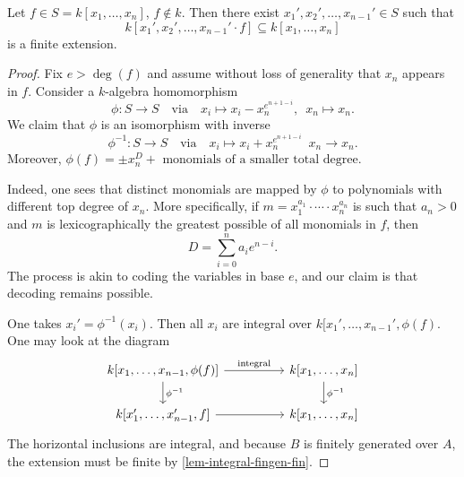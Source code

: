 \begin{lemma}
  Let $f \in S = k[x_1, \dotsc, x_n]$, $f \notin k$. Then there exist $x_1', x_2', \dotsc, x_{n-1}' \in S$ such that
  \[k[x_1', x_2', \dotsc, x_{n-1}' \cdot f] \subseteq k[x_1, \dotsc, x_n]\]
  is a finite extension.
\end{lemma}
\begin{proof}
  Fix $e > \deg(f)$ and assume without loss of generality that $x_n$ appears in $f$. Consider a $k$-algebra homomorphism
  \[ \phi \colon S \to S \quad \text{via} \quad x_i \mapsto x_i - x_n^{e^{n+1-i}}, \enspace x_n \mapsto x_n.\]
  We claim that $\phi$ is an isomorphism with inverse
  \[ \phi^{-1} \colon S \to S \quad \text{via} \quad x_i \mapsto x_i + x_n^{e^{n+1-i}} \enspace x_n \to x_n.\]
  Moreover, $\phi(f) = \pm x_n^D + \text{ monomials of a smaller total degree}$.

  Indeed, one sees that distinct monomials are mapped by $\phi$ to polynomials with different top degree of $x_n$. More specifically, if $m = x_1^{a_1} \cdot \dotsb \cdot x_n^{a_n}$ is such that $a_n > 0$ and $m$ is lexicographically the greatest possible of all monomials in $f$, then
  \[ D = \sum_{i=0}^n a_i e^{n-i}.\]
  The process is akin to coding the variables in base $e$, and our claim is that decoding remains possible.

  One takes $x_i' = \phi^{-1}(x_i)$. Then all $x_i$ are integral over $k[x_1', \dotsc, x_{n-1}', \phi(f)$. One may look at the diagram
  \[
  \begin{tikzcd}[column sep = huge]
    k[x_1, \dotsc, x_{n-1}, \phi(f)] \arrow{r}{\text{integral}} \arrow{d}{\phi^{-1}}
    & k[x_1, \dotsc, x_n] \arrow{d}{\phi^{-1}} \\
    k[x_1', \dotsc, x_{n-1}', f] \arrow{r}
    & k[x_1, \dotsc, x_n]
  \end{tikzcd}
  \]
  The horizontal inclusions are integral, and because $B$ is finitely generated over $A$, the extension must be finite by \cref{lem-integral-fingen-fin}.
\end{proof}

